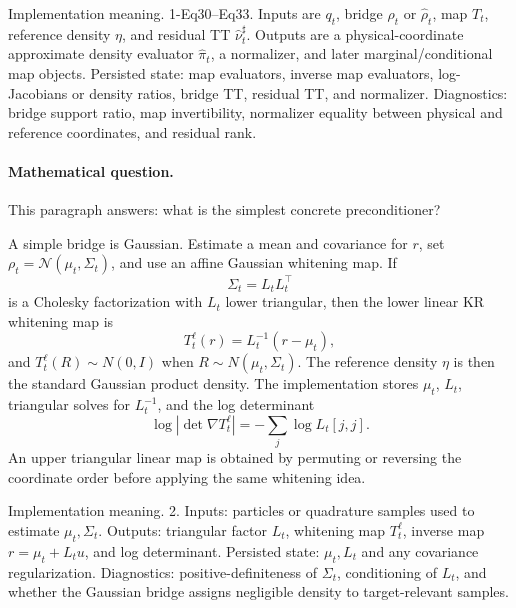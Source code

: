 \documentclass[11pt]{article}
\numberwithin{equation}{section}
\begin{document}
Implementation meaning. 1-Eq30--Eq33.  Inputs are \(q_t\), bridge
\(\rho_t\) or \(\widehat\rho_t\), map \(T_t\), reference density \(\eta\), and
residual TT \(\widehat\nu_t^\sharp\).  Outputs are a physical-coordinate
approximate density evaluator \(\widehat\pi_t\), a normalizer, and later
marginal/conditional map objects.  Persisted state: map evaluators, inverse map
evaluators, log-Jacobians or density ratios, bridge TT, residual TT, and
normalizer.  Diagnostics: bridge support ratio, map invertibility,
normalizer equality between physical and reference coordinates, and residual
rank.

\paragraph{Mathematical question.}
This paragraph answers: what is the simplest concrete preconditioner?

A simple bridge is Gaussian.  Estimate a mean and covariance for \(r\), set
\(\rho_t=\mathcal N(\mu_t,\Sigma_t)\), and use an affine Gaussian whitening map.
If
\begin{equation}
    \Sigma_t=L_tL_t^\top
    \label{eq:p24-p6a}
\end{equation}
is a Cholesky factorization with \(L_t\) lower triangular, then the lower
linear KR whitening map is
\begin{equation}
    T_t^{\ell}(r)
    =
    L_t^{-1}(r-\mu_t),
    \label{eq:p24-p6b}
\end{equation}
and \(T_t^{\ell}(R)\sim N(0,I)\) when \(R\sim N(\mu_t,\Sigma_t)\).  The
reference density \(\eta\) is then the standard Gaussian product density.  The
implementation stores \(\mu_t\), \(L_t\), triangular solves for \(L_t^{-1}\),
and the log determinant
\begin{equation}
    \log|\det\nabla T_t^{\ell}|
    =
    -\sum_j\log L_t[j,j].
    \label{eq:p24-p6c}
\end{equation}
An upper triangular linear map is obtained by permuting or reversing the
coordinate order before applying the same whitening idea.

Implementation meaning. 2.  Inputs: particles or quadrature samples used
to estimate \(\mu_t,\Sigma_t\).  Outputs: triangular factor \(L_t\), whitening
map \(T_t^\ell\), inverse map \(r=\mu_t+L_tu\), and log determinant.  Persisted
state: \(\mu_t,L_t\) and any covariance regularization.  Diagnostics:
positive-definiteness of \(\Sigma_t\), conditioning of \(L_t\), and whether the
Gaussian bridge assigns negligible density to target-relevant samples.
\end{document}
